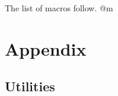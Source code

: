 \documentclass[11pt,oneside]{article}	%
\begin{document}
The list of macros follow.
@m

\appendix
\section{Appendix}
\label{sec:utilities}

\subsection{Utilities}






\end{document}
